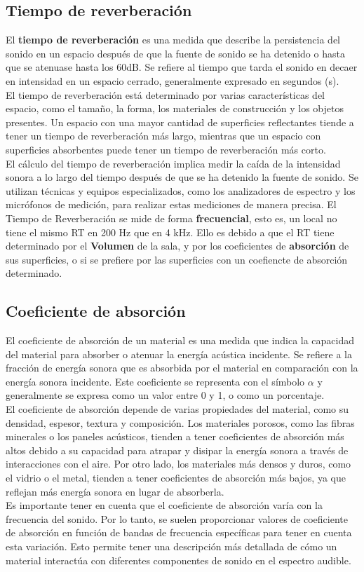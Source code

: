 \documentclass[
	12pt, %
	fleqn, %
	a4paper, %
	oneside, %
]{LegrandOrangeBook}
\begin{document}
\subsection{Tiempo de reverberación}
El \textbf{tiempo de reverberación} es una medida que describe la persistencia del sonido en un espacio después de que la fuente de sonido se ha detenido o hasta que se atenuase hasta los 60dB. Se refiere al tiempo que tarda el sonido en decaer en intensidad en un espacio cerrado, generalmente expresado en segundos (s). \\
El tiempo de reverberación está determinado por varias características del espacio, como el tamaño, la forma, los materiales de construcción y los objetos presentes. Un espacio con una mayor cantidad de superficies reflectantes tiende a tener un tiempo de reverberación más largo, mientras que un espacio con superficies absorbentes puede tener un tiempo de reverberación más corto.\\
El cálculo del tiempo de reverberación implica medir la caída de la intensidad sonora a lo largo del tiempo después de que se ha detenido la fuente de sonido. Se utilizan técnicas y equipos especializados, como los analizadores de espectro y los micrófonos de medición, para realizar estas mediciones de manera precisa. El Tiempo de Reverberación se mide de forma \textbf{frecuencial}, esto es, un local no tiene el mismo RT en 200 Hz que en 4 kHz. Ello es debido a que el RT tiene determinado por el \textbf{Volumen} de la sala, y por los coeficientes de \textbf{absorción} de sus superficies, o si se prefiere por las superficies con un coefiencte de absorción determinado.
\subsection{Coeficiente de absorción}
El coeficiente de absorción de un material es una medida que indica la capacidad del material para absorber o atenuar la energía acústica incidente. Se refiere a la fracción de energía sonora que es absorbida por el material en comparación con la energía sonora incidente. Este coeficiente se representa con el símbolo $\alpha$ y generalmente se expresa como un valor entre 0 y 1, o como un porcentaje.\\
El coeficiente de absorción depende de varias propiedades del material, como su densidad, espesor, textura y composición. Los materiales porosos, como las fibras minerales o los paneles acústicos, tienden a tener coeficientes de absorción más altos debido a su capacidad para atrapar y disipar la energía sonora a través de interacciones con el aire. Por otro lado, los materiales más densos y duros, como el vidrio o el metal, tienden a tener coeficientes de absorción más bajos, ya que reflejan más energía sonora en lugar de absorberla.\\
Es importante tener en cuenta que el coeficiente de absorción varía con la frecuencia del sonido. Por lo tanto, se suelen proporcionar valores de coeficiente de absorción en función de bandas de frecuencia específicas para tener en cuenta esta variación. Esto permite tener una descripción más detallada de cómo un material interactúa con diferentes componentes de sonido en el espectro audible.\\
\end{document}
